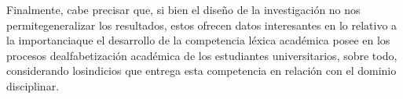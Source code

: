 \documentclass{textolivre}
\begin{document}
Finalmente, cabe precisar que, si bien el diseño de la investigación no nos
permitegeneralizar los resultados, estos ofrecen datos interesantes en lo
relativo a la importanciaque el desarrollo de la competencia léxica académica
posee en los procesos dealfabetización académica de los estudiantes
universitarios, sobre todo, considerando losindicios que entrega esta
competencia en relación con el dominio disciplinar.


\printbibliography\label{sec-bib}
\end{document}
